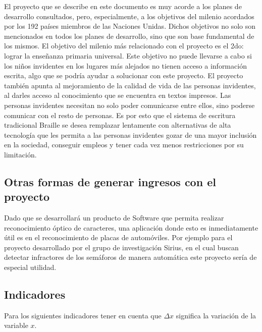 \documentclass[a4paper, 12pt, oneside]{article}
\begin{document}
	El proyecto que se describe en este documento es muy acorde a los planes de desarrollo consultados, pero, especialmente, a los objetivos del milenio acordados por los 192 países miembros de las Naciones Unidas. Dichos objetivos no solo son mencionados en todos los planes de desarrollo, sino que son base fundamental de los mismos. El objetivo del milenio más relacionado con el proyecto es el 2do: lograr la enseñanza primaria universal. Este objetivo no puede llevarse a cabo si los niños invidentes en los lugares más alejados no tienen acceso a información escrita, algo que se podría ayudar a solucionar con este proyecto.
	El proyecto también apunta al mejoramiento de la calidad de vida de las personas invidentes, al darles
	acceso al conocimiento que se encuentra en textos impresos. Las personas invidentes necesitan no solo
	poder comunicarse entre ellos, sino poderse comunicar con el resto de personas. Es por esto que el sistema
	de escritura tradicional Braille se desea remplazar lentamente con alternativas de alta tecnología
	que les permita a las personas invidentes gozar de una mayor inclusión en la sociedad, conseguir empleos
	y tener cada vez menos restricciones por su limitación.
	
	\subsection{Otras formas de generar ingresos con el proyecto}
	Dado que se desarrollará un producto de Software que permita realizar reconocimiento óptico de caracteres, una aplicación donde esto es inmediatamente útil es en el reconocimiento de placas de automóviles. Por ejemplo para el proyecto desarrollado por el grupo de investigación Sirius, en el cual buscan detectar infractores de los semáforos de manera automática este proyecto sería de especial utilidad.
	
	\clearpage
	
	\begin{center}
	\appendix
	\section{Indicadores}
	\end{center}
	
	Para los siguientes indicadores tener en cuenta que $\Delta x$ significa la variación de la variable $x$.
	
\end{document}
